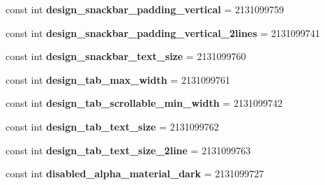 \begin{DoxyCompactItemize}
const int {\bfseries design\+\_\+snackbar\+\_\+padding\+\_\+vertical} = 2131099759
\item 
\mbox{\label{class_sample_app_1_1_droid_1_1_resource_1_1_dimension_a23f6a8863c64cd643eebc7073f482860}} 
const int {\bfseries design\+\_\+snackbar\+\_\+padding\+\_\+vertical\+\_\+2lines} = 2131099741
\item 
\mbox{\label{class_sample_app_1_1_droid_1_1_resource_1_1_dimension_a8b490039146c699774b4c390843c2405}} 
const int {\bfseries design\+\_\+snackbar\+\_\+text\+\_\+size} = 2131099760
\item 
\mbox{\label{class_sample_app_1_1_droid_1_1_resource_1_1_dimension_a6604c5662c3ce267a2de657cee4ea50f}} 
const int {\bfseries design\+\_\+tab\+\_\+max\+\_\+width} = 2131099761
\item 
\mbox{\label{class_sample_app_1_1_droid_1_1_resource_1_1_dimension_ad097206a19424a591a66e07e58e8664f}} 
const int {\bfseries design\+\_\+tab\+\_\+scrollable\+\_\+min\+\_\+width} = 2131099742
\item 
\mbox{\label{class_sample_app_1_1_droid_1_1_resource_1_1_dimension_ad3698c618b2993540f9b80743fe8ee0a}} 
const int {\bfseries design\+\_\+tab\+\_\+text\+\_\+size} = 2131099762
\item 
\mbox{\label{class_sample_app_1_1_droid_1_1_resource_1_1_dimension_a9dab13de18b657f92366d44c0e02476f}} 
const int {\bfseries design\+\_\+tab\+\_\+text\+\_\+size\+\_\+2line} = 2131099763
\item 
\mbox{\label{class_sample_app_1_1_droid_1_1_resource_1_1_dimension_a9661f77d41f3b5392550ce83911e85e6}} 
const int {\bfseries disabled\+\_\+alpha\+\_\+material\+\_\+dark} = 2131099727
\item 
\mbox{\label{class_sample_app_1_1_droid_1_1_resource_1_1_dimension_a49684ac7318ac7d812c2aa6ee35dce55}} 

\end{DoxyCompactItemize}
